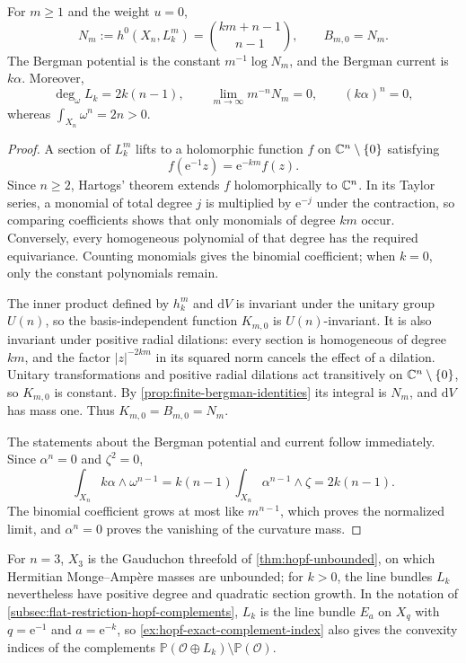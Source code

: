 \begin{proposition}\label{prop:hopf-bergman-exact}
For $m\geq1$ and the weight $u=0$,
\[
 N_m:=h^0(X_n,L_k^m)=\binom{km+n-1}{n-1},
 \qquad B_{m,0}=N_m.
\]
The Bergman potential is the constant $m^{-1}\log N_m$, and the Bergman current is $k\alpha$. Moreover,
\[
 \deg_\omega L_k=2k(n-1),\qquad
 \lim_{m\to\infty}m^{-n}N_m=0,
 \qquad (k\alpha)^n=0,
\]
whereas $\int_{X_n}\omega^n=2n>0$.
\end{proposition}
\begin{proof}
A section of $L_k^m$ lifts to a holomorphic function $f$ on $\mathbb C^n\setminus\{0\}$ satisfying
\[
 f(\mathrm{e}^{-1}z)=\mathrm{e}^{-km}f(z).
\]
Since $n\geq2$, Hartogs' theorem extends $f$ holomorphically to $\mathbb C^n$. In its Taylor series, a monomial of total degree $j$ is multiplied by $\mathrm{e}^{-j}$ under the contraction, so comparing coefficients shows that only monomials of degree $km$ occur. Conversely, every homogeneous polynomial of that degree has the required equivariance. Counting monomials gives the binomial coefficient; when $k=0$, only the constant polynomials remain.

The inner product defined by $h_k^m$ and $\mathrm{d}V$ is invariant under the unitary group $U(n)$, so the basis-independent function $K_{m,0}$ is $U(n)$-invariant. It is also invariant under positive radial dilations: every section is homogeneous of degree $km$, and the factor $|z|^{-2km}$ in its squared norm cancels the effect of a dilation. Unitary transformations and positive radial dilations act transitively on $\mathbb C^n\setminus\{0\}$, so $K_{m,0}$ is constant. By \cref{prop:finite-bergman-identities} its integral is $N_m$, and $\mathrm{d}V$ has mass one. Thus $K_{m,0}=B_{m,0}=N_m$.

The statements about the Bergman potential and current follow immediately. Since $\alpha^n=0$ and $\zeta^2=0$,
\[
 \int_{X_n}k\alpha\wedge\omega^{n-1}
 =k(n-1)\int_{X_n}\alpha^{n-1}\wedge\zeta
 =2k(n-1).
\]
The binomial coefficient grows at most like $m^{n-1}$, which proves the normalized limit, and $\alpha^n=0$ proves the vanishing of the curvature mass.
\end{proof}

For $n=3$, $X_3$ is the Gauduchon threefold of \cref{thm:hopf-unbounded}, on which Hermitian Monge--Amp\`ere masses are unbounded; for $k>0$, the line bundles $L_k$ nevertheless have positive degree and quadratic section growth. In the notation of \cref{subsec:flat-restriction-hopf-complements}, $L_k$ is the line bundle $E_a$ on $X_q$ with $q=\mathrm e^{-1}$ and $a=\mathrm e^{-k}$, so \cref{ex:hopf-exact-complement-index} also gives the convexity indices of the complements $\mathbb P(\mathcal O\oplus L_k)\setminus\mathbb P(\mathcal O)$.

